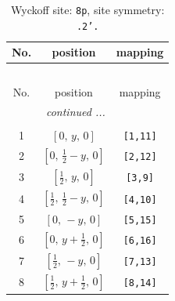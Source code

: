 \documentclass[fleqn,8pt]{jsarticle}
\begin{document}
\begin{longtable}{ccc}
\caption{Wyckoff site: {\tt 8p}, site symmetry: {\tt .2'.}}
 \\
 \hline \hline
No. & position & mapping \\ \hline \endfirsthead

\multicolumn{2}{l}{\tablename\ \thetable{}} \\
 \hline \hline
No. & position & mapping \\ \hline \endhead

 \hline \hline
\multicolumn{2}{r}{\footnotesize\it continued ...} \\ \endfoot

 \hline \hline
\multicolumn{2}{r}{} \\ \endlastfoot

1 & $\left[ 0,\, y,\, 0 \right]$ & {\tt [1,11]} \\ \hline
2 & $\left[ 0,\, \frac{1}{2} - y,\, 0 \right]$ & {\tt [2,12]} \\ \hline
3 & $\left[ \frac{1}{2},\, y,\, 0 \right]$ & {\tt [3,9]} \\ \hline
4 & $\left[ \frac{1}{2},\, \frac{1}{2} - y,\, 0 \right]$ & {\tt [4,10]} \\ \hline
5 & $\left[ 0,\, - y,\, 0 \right]$ & {\tt [5,15]} \\ \hline
6 & $\left[ 0,\, y + \frac{1}{2},\, 0 \right]$ & {\tt [6,16]} \\ \hline
7 & $\left[ \frac{1}{2},\, - y,\, 0 \right]$ & {\tt [7,13]} \\ \hline
8 & $\left[ \frac{1}{2},\, y + \frac{1}{2},\, 0 \right]$ & {\tt [8,14]} \\
\end{longtable}
\renewcommand{\arraystretch}{1.2}
\end{document}
